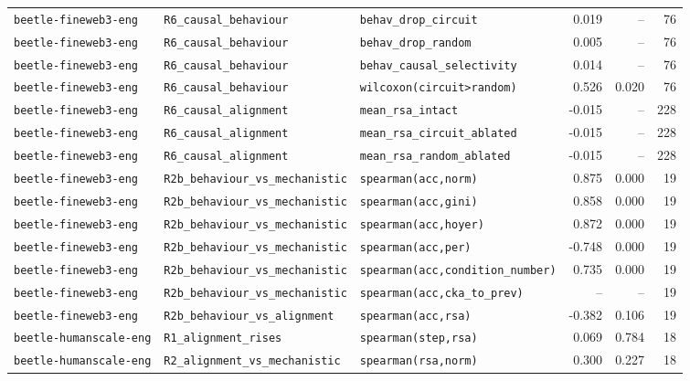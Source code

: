 \begin{longtable}{lllrrr}
\texttt{beetle-fineweb3-eng} & \texttt{R6\_causal\_behaviour} & \texttt{behav\_drop\_circuit} & 0.019 & -- & 76 \\
\texttt{beetle-fineweb3-eng} & \texttt{R6\_causal\_behaviour} & \texttt{behav\_drop\_random} & 0.005 & -- & 76 \\
\texttt{beetle-fineweb3-eng} & \texttt{R6\_causal\_behaviour} & \texttt{behav\_causal\_selectivity} & 0.014 & -- & 76 \\
\texttt{beetle-fineweb3-eng} & \texttt{R6\_causal\_behaviour} & \texttt{wilcoxon(circuit>random)} & 0.526 & 0.020 & 76 \\
\texttt{beetle-fineweb3-eng} & \texttt{R6\_causal\_alignment} & \texttt{mean\_rsa\_intact} & -0.015 & -- & 228 \\
\texttt{beetle-fineweb3-eng} & \texttt{R6\_causal\_alignment} & \texttt{mean\_rsa\_circuit\_ablated} & -0.015 & -- & 228 \\
\texttt{beetle-fineweb3-eng} & \texttt{R6\_causal\_alignment} & \texttt{mean\_rsa\_random\_ablated} & -0.015 & -- & 228 \\
\texttt{beetle-fineweb3-eng} & \texttt{R2b\_behaviour\_vs\_mechanistic} & \texttt{spearman(acc,norm)} & 0.875 & 0.000 & 19 \\
\texttt{beetle-fineweb3-eng} & \texttt{R2b\_behaviour\_vs\_mechanistic} & \texttt{spearman(acc,gini)} & 0.858 & 0.000 & 19 \\
\texttt{beetle-fineweb3-eng} & \texttt{R2b\_behaviour\_vs\_mechanistic} & \texttt{spearman(acc,hoyer)} & 0.872 & 0.000 & 19 \\
\texttt{beetle-fineweb3-eng} & \texttt{R2b\_behaviour\_vs\_mechanistic} & \texttt{spearman(acc,per)} & -0.748 & 0.000 & 19 \\
\texttt{beetle-fineweb3-eng} & \texttt{R2b\_behaviour\_vs\_mechanistic} & \texttt{spearman(acc,condition\_number)} & 0.735 & 0.000 & 19 \\
\texttt{beetle-fineweb3-eng} & \texttt{R2b\_behaviour\_vs\_mechanistic} & \texttt{spearman(acc,cka\_to\_prev)} & -- & -- & 19 \\
\texttt{beetle-fineweb3-eng} & \texttt{R2b\_behaviour\_vs\_alignment} & \texttt{spearman(acc,rsa)} & -0.382 & 0.106 & 19 \\
\texttt{beetle-humanscale-eng} & \texttt{R1\_alignment\_rises} & \texttt{spearman(step,rsa)} & 0.069 & 0.784 & 18 \\
\texttt{beetle-humanscale-eng} & \texttt{R2\_alignment\_vs\_mechanistic} & \texttt{spearman(rsa,norm)} & 0.300 & 0.227 & 18 \\

\end{longtable}
